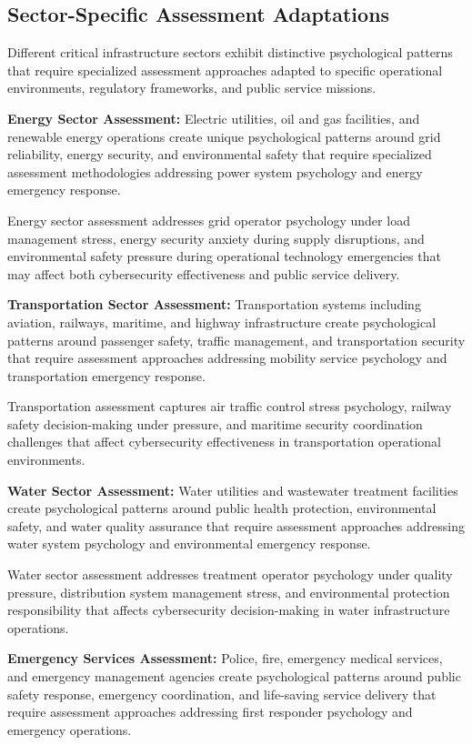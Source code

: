 \documentclass[10pt, twocolumn]{article}
\begin{document}
\subsection{Sector-Specific Assessment Adaptations}

Different critical infrastructure sectors exhibit distinctive psychological patterns that require specialized assessment approaches adapted to specific operational environments, regulatory frameworks, and public service missions.

\textbf{Energy Sector Assessment:} Electric utilities, oil and gas facilities, and renewable energy operations create unique psychological patterns around grid reliability, energy security, and environmental safety that require specialized assessment methodologies addressing power system psychology and energy emergency response.

Energy sector assessment addresses grid operator psychology under load management stress, energy security anxiety during supply disruptions, and environmental safety pressure during operational technology emergencies that may affect both cybersecurity effectiveness and public service delivery.

\textbf{Transportation Sector Assessment:} Transportation systems including aviation, railways, maritime, and highway infrastructure create psychological patterns around passenger safety, traffic management, and transportation security that require assessment approaches addressing mobility service psychology and transportation emergency response.

Transportation assessment captures air traffic control stress psychology, railway safety decision-making under pressure, and maritime security coordination challenges that affect cybersecurity effectiveness in transportation operational environments.

\textbf{Water Sector Assessment:} Water utilities and wastewater treatment facilities create psychological patterns around public health protection, environmental safety, and water quality assurance that require assessment approaches addressing water system psychology and environmental emergency response.

Water sector assessment addresses treatment operator psychology under quality pressure, distribution system management stress, and environmental protection responsibility that affects cybersecurity decision-making in water infrastructure operations.

\textbf{Emergency Services Assessment:} Police, fire, emergency medical services, and emergency management agencies create psychological patterns around public safety response, emergency coordination, and life-saving service delivery that require assessment approaches addressing first responder psychology and emergency operations.
\end{document}
